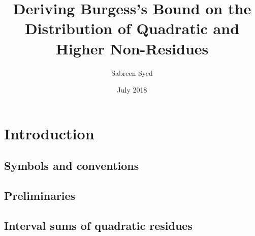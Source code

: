 \documentclass{report}
\title{Deriving Burgess's Bound on the Distribution of Quadratic and Higher Non-Residues}
\author{
  Sabreen Syed\\
  \multicolumn{1}{p{.7\textwidth}}{\centering\emph{Department of Computer Science and Engineering\\
  Indian Institute of Technology Kanpur, India}}}
\date{July 2018}
\begin{document}

\maketitle

\chapter{Introduction}
%
\section{Symbols and conventions}
%
\section{Preliminaries}
%
\section{Interval sums of quadratic residues}
%
\end{document}
